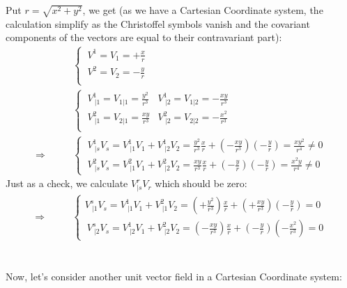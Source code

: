 Put $ r = \sqrt{x^2+y^2}$, we get (as we have a Cartesian Coordinate system, the calculation simplify as the Christoffel symbols vanish and the covariant components of the vectors are equal to their contravariant part):
\begin{align}
\ & \left \{ \begin{array}{c}
\ V^1 = V_1 = +\frac{x}{r}\\
\ V^2 = V_2 = -\frac{y}{r}\\
\end{array}\right.\\
\ & \left \{ \begin{array}{cc}
\ V^1_{\ |1} =  V_{1|1} = \frac{y^2}{r^3}&V^1_{\ |2} =  V_{1|2} = -\frac{xy}{r^3}\\
\ V^2_{\ |1} =  V_{2|1} = \frac{xy}{r^3}&V^2_{\ |2} =  V_{2|2} = -\frac{x^2}{r^3}\\
\end{array}\right.\\
\Rightarrow \quad\quad &\left \{ \begin{array}{c} \  V^1_{\ |s}V_s = V^1_{\ |1}V_1+V^1_{\ |2}V_2 = \frac{y^2}{r^3}\frac{x}{r}+ (-\frac{xy}{r^3})(-\frac{y}{r}) = \frac{xy^2}{r^4} \ne 0\\
\ V^2_{\ |s}V_s = V^2_{\ |1}V_1+V^2_{\ |2}V_2 = \frac{xy}{r^3}\frac{x}{r}+ (-\frac{y}{r})(-\frac{y}{r}) = \frac{x^2 y}{r^4} \ne 0
\end{array} \right.
\end{align}
Just as a check, we calculate $V^r_{|s}V_r$ which should be zero:
\begin{align}
\Rightarrow \quad\quad &\left \{ \begin{array}{c}V^s_{\ |1}V_s = V^1_{\ |1}V_1+V^2_{\ |1}V_2 = (+\frac{y^2}{r^3})\frac{x}{r}+ (+\frac{xy}{r^3})(-\frac{y}{r}) =0\\
\ V^s_{\ |2}V_s = V^1_{\ |2}V_1+V^2_{\ |2}V_2 = (-\frac{xy}{r^3})\frac{x}{r}+ (-\frac{y}{r})(-\frac{x^2}{r^3}) = 0
\end{array} \right.
\end{align}\\\\
Now, let's consider another unit vector field in a Cartesian Coordinate system:
